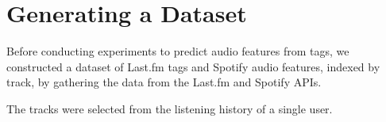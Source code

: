 \documentclass[sn-mathphys]{sn-jnl}%
\theoremstyle{thmstyleone}%
\theoremstyle{thmstyletwo}%
\theoremstyle{thmstylethree}%
\begin{document}






%

\section{Generating a Dataset}

Before conducting experiments to predict audio features from tags,
we constructed a dataset of Last.fm tags and Spotify audio features, indexed by track, by gathering the data from the Last.fm and Spotify APIs.

The tracks were selected from the listening history of a single user.
\end{document}
